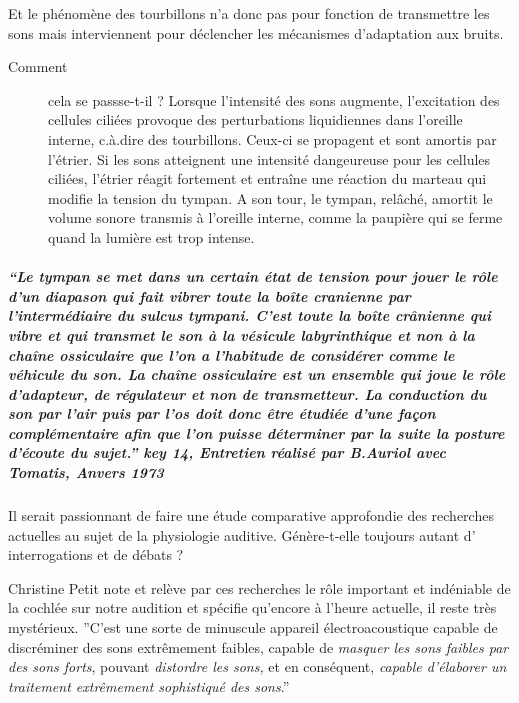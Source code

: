 \documentclass[12pt,french]{report}
\makeatletter
\let\SF@@footnote\footnote
\def\footnote{\ifx\protect\@typeset@protect
    \expandafter\SF@@footnote
  \else
    \expandafter\SF@gobble@opt
  \fi
}
\edef\SF@gobble@opt{\noexpand\protect
  \expandafter\noexpand\csname SF@gobble@opt \endcsname}
\makeatother
\begin{document}
Et le phénomène des tourbillons n'a donc pas pour fonction de transmettre
les sons mais interviennent pour déclencher les mécanismes d'adaptation
aux bruits. 
\begin{description}
\item [{Comment}] cela se passse-t-il ? Lorsque l'intensité des sons augmente,
l'excitation des cellules ciliées provoque des perturbations liquidiennes
dans l'oreille interne, c.à.dire des tourbillons. Ceux-ci se propagent
et sont amortis par l'étrier. Si les sons atteignent une intensité
dangeureuse pour les cellules ciliées, l'étrier réagit fortement et
entraîne une réaction du marteau qui modifie la tension du tympan.
A son tour, le tympan, relâché, amortit le volume sonore transmis
à l'oreille interne, comme la paupière qui se ferme quand la lumière
est trop intense.
\end{description}

\subparagraph*{``Le tympan se met dans un certain état de tension pour jouer le
rôle d\textquoteright un diapason qui fait vibrer toute la boîte cranienne
par l'intermédiaire du sulcus tympani. \emph{C'est toute la boîte
crânienne qui vibre et qui transmet le son à la vésicule labyrinthique
et non à la chaîne ossiculaire que l'on a l'habitude de considérer
comme le véhicule du son. }La chaîne ossiculaire est un ensemble qui
joue le rôle d'adapteur, de régulateur et non de transmetteur. La
conduction du son par l\textquoteright air puis par l'os doit donc
être étudiée d\textquoteright une façon complémentaire afin que l'on
puisse déterminer par la suite la posture d'écoute du sujet.''\protect\footnote{key 14, Entretien réalisé par B.Auriol avec Tomatis, Anvers 1973}}

Il serait passionnant de faire une étude comparative approfondie des
recherches actuelles au sujet de la physiologie auditive. Génère-t-elle
toujours autant d' interrogations et de débats ?

Christine Petit note et relève par ces recherches le rôle important
et indéniable de la cochlée sur notre audition et spécifie qu'encore
à l'heure actuelle, il reste très mystérieux. 
''C'est une sorte de minuscule appareil électroacoustique capable
de discréminer des sons extrêmement faibles, capable de \emph{masquer
les sons faibles par des sons forts}, pouvant \emph{distordre les
sons,} et en conséquent, \emph{capable d'élaborer un traitement extrêmement
sophistiqué des sons}.''
\end{document}
